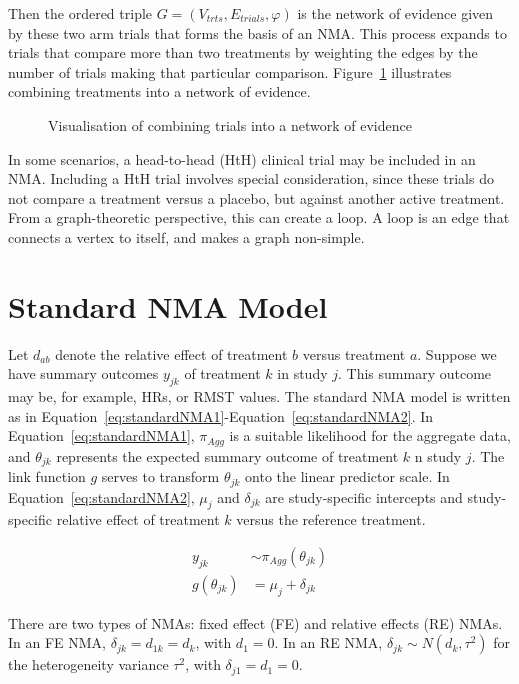 Then the ordered triple $G = (V_{trts}, E_{trials}, \varphi)$ is the network of evidence given by these two arm trials that forms the basis of an NMA. This process expands to trials that compare more than two treatments by weighting the edges by the number of trials making that particular comparison. Figure~\ref{fig:comb_evi} illustrates combining treatments into a network of evidence.\\

\begin{figure}[h]
    \centering
    
    \caption{Visualisation of combining trials into a network of evidence}
    \label{fig:comb_evi}
\end{figure}

In some scenarios, a head-to-head (HtH) clinical trial may be included in an NMA. Including a HtH trial involves special consideration, since these trials do not compare a treatment versus a placebo, but against another active treatment. From a graph-theoretic perspective, this can create a loop. A loop is an edge that connects a vertex to itself, and makes a graph non-simple.

\section{Standard NMA Model}
Let $d_{ab}$ denote the relative effect of treatment $b$ versus treatment $a$. Suppose we have summary outcomes $y_{jk}$ of treatment $k$ in study $j$. This summary outcome may be, for example, HRs, or RMST values. The standard NMA model is written as in Equation~\ref{eq:standardNMA1}-Equation~\ref{eq:standardNMA2}. In Equation~\ref{eq:standardNMA1}, $\pi_{Agg}$ is a suitable likelihood for the aggregate data, and $\theta_{jk}$ represents the expected summary outcome of treatment $k$ 
n study $j$. The link function $g$ serves to transform $\theta_{jk}$ onto the linear predictor scale. In Equation~\ref{eq:standardNMA2}, $\mu_j$ and $\delta_{jk}$ are study-specific intercepts and study-specific relative effect of treatment $k$ versus the reference treatment.

\begin{align}
    y_{jk} &\sim \pi_{Agg}(\theta_{jk}) \label{eq:standardNMA1} \\
    g(\theta_{jk}) &= \mu_j + \delta_{jk} \label{eq:standardNMA2}
\end{align}

There are two types of NMAs: fixed effect (FE) and relative effects (RE) NMAs. In an FE NMA, $\delta_{jk} = d_{1k} = d_k$, with $d_1 = 0$. In an RE NMA, $\delta_{jk} \sim N(d_k, \tau^2)$ for the heterogeneity variance $\tau^2$, with $\delta_{j1} = d_1 = 0$. \\

